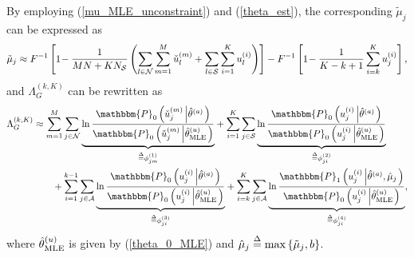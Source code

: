 \documentclass[11pt, draftclsnofoot, onecolumn]{IEEEtran}
\newcommand{\bbP}{\mathbbm{P}}
\newcommand{\cu}{{\check{u}}}
\begin{document}
By employing (\ref{mu_MLE_unconstraint}) and (\ref{theta_est}), the corresponding ${\tilde \mu }_j$ can be expressed as
\begin{equation} \label{tilde_mu_approx}
{{\tilde \mu }_j}  \approx {F^{ - 1}}\left[ {1 \! - \frac{1}{{MN + K{N_{\cal S}}}}\left( {\sum\limits_{l \in {\cal N}} {\sum\limits_{m = 1}^M {\cu_l^{(m)}} }  + \sum\limits_{l \in {\cal S}} {\sum\limits_{i = 1}^K {u_l^{(i)}} } } \right)} \right]  -   {F^{ - 1}}\left[ {1 \!  - \frac{1}{{K - k + 1}}\sum\limits_{i = k}^K {u_j^{(i)}} } \right],
\end{equation}
and $\Lambda _G^{(k,K)}$ can be rewritten as
\begin{align} \notag 
\Lambda _G^{(k,K)} & \approx \sum\limits_{m = 1}^M {\sum\limits_{j \in {\cal N}} {\underbrace {\ln \frac{{{\bbP_0}\left( {\cu_j^{(m)}\left| {{{\hat \theta }^{(a)}}} \right.} \right)}}{{{\bbP_0}\left( {\cu_j^{(m)}\left| {\hat \theta _{{\rm{MLE}}}^{(u)}} \right.} \right)}}}_{ \buildrel \Delta \over = \phi _{jm}^{\left( 1 \right)}}} }  + \sum\limits_{i = 1}^K {\sum\limits_{j \in {\cal S}} {\underbrace {\ln \frac{{{\bbP_0}\left( {u_j^{(i)}\left| {{{\hat \theta }^{(a)}}} \right.} \right)}}{{{\bbP_0}\left( {u_j^{(i)}\left| {\hat \theta _{{\rm{MLE}}}^{(u)}} \right.} \right)}}}_{ \buildrel \Delta \over = \phi _{ji}^{\left( 2 \right)}}} } \\ \label{Lambda_G_Simplified}
& \qquad + \sum\limits_{i = 1}^{k - 1} {\sum\limits_{j \in {\cal A}} {\underbrace {\ln \frac{{{\bbP_0}\left( {u_j^{(i)}\left| {{{\hat \theta }^{(a)}}} \right.} \right)}}{{{\bbP_0}\left( {u_j^{(i)}\left| {\hat \theta _{{\rm{MLE}}}^{(u)}} \right.} \right)}}}_{ \buildrel \Delta \over = \phi _{ji}^{\left( 3 \right)}}} }  + \sum\limits_{i = k}^K {\sum\limits_{j \in {\cal A}} {\underbrace {\ln \frac{{{\bbP_1}\left( {u_j^{(i)}\left| {{{\hat \theta }^{(a)}},{{\hat \mu }_j}} \right.} \right)}}{{{\bbP_0}\left( {u_j^{(i)}\left| {\hat \theta _{{\rm{MLE}}}^{(u)}} \right.} \right)}}}_{ \buildrel \Delta \over = \phi _{ji}^{\left( 4 \right)}}} },
\end{align}
where ${\hat \theta _{{\rm{MLE}}}^{(u)}}$ is given by (\ref{theta_0_MLE}) and ${{\hat \mu }_j} \buildrel \Delta \over = \max \left\{ {{{\tilde \mu }_j},b} \right\}$.

\end{document}
